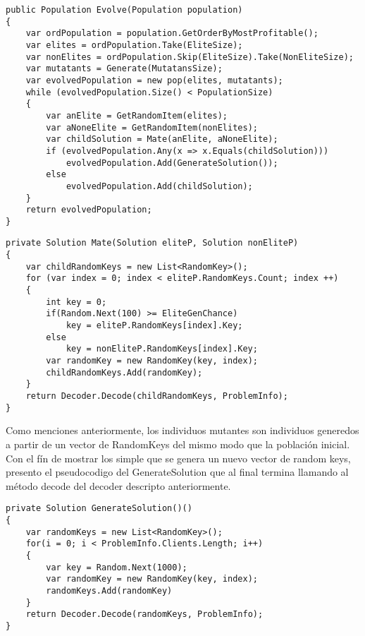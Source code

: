 \bigskip

\begin{minipage}{\textwidth}
\begin{lstlisting}
public Population Evolve(Population population)
{
    var ordPopulation = population.GetOrderByMostProfitable();
    var elites = ordPopulation.Take(EliteSize);
    var nonElites = ordPopulation.Skip(EliteSize).Take(NonEliteSize);
    var mutatants = Generate(MutatansSize);
    var evolvedPopulation = new pop(elites, mutatants);
    while (evolvedPopulation.Size() < PopulationSize)
    {
		var anElite = GetRandomItem(elites);
		var aNoneElite = GetRandomItem(nonElites);
        var childSolution = Mate(anElite, aNoneElite);
        if (evolvedPopulation.Any(x => x.Equals(childSolution)))
            evolvedPopulation.Add(GenerateSolution());
        else
            evolvedPopulation.Add(childSolution);
    }
    return evolvedPopulation;
}
\end{lstlisting}
\end{minipage}

\begin{minipage}{\textwidth}
\begin{lstlisting}
private Solution Mate(Solution eliteP, Solution nonEliteP)
{
	var childRandomKeys = new List<RandomKey>();
	for (var index = 0; index < eliteP.RandomKeys.Count; index ++)
	{
		int key = 0;
		if(Random.Next(100) >= EliteGenChance)
			key = eliteP.RandomKeys[index].Key;
		else
			key = nonEliteP.RandomKeys[index].Key;
		var randomKey = new RandomKey(key, index);
		childRandomKeys.Add(randomKey);
	}
	return Decoder.Decode(childRandomKeys, ProblemInfo);
}
\end{lstlisting}
\end{minipage}

\bigskip

Como menciones anteriormente, los individuos mutantes son individuos generedos a partir de un vector de RandomKeys del mismo modo que la población inicial. Con el fín de mostrar los simple que se genera un nuevo vector de random keys, presento el pseudocodigo del GenerateSolution que al final termina llamando al método decode del decoder descripto anteriormente.

\bigskip

\begin{minipage}{\textwidth}
\begin{lstlisting}
private Solution GenerateSolution()()
{
	var randomKeys = new List<RandomKey>();
	for(i = 0; i < ProblemInfo.Clients.Length; i++)
	{
		var key = Random.Next(1000);
		var randomKey = new RandomKey(key, index);
		randomKeys.Add(randomKey)
	}
	return Decoder.Decode(randomKeys, ProblemInfo);
}
\end{lstlisting}
\end{minipage}


